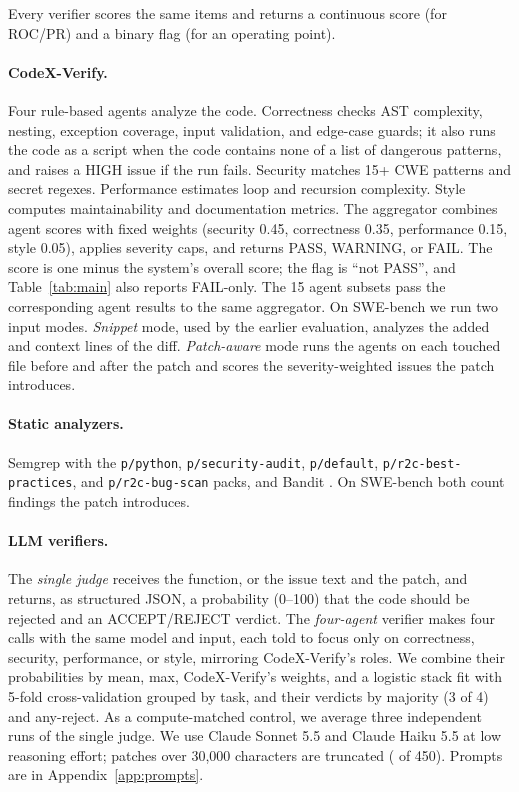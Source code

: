 Every verifier scores the same items and returns a continuous score (for ROC/PR) and a binary flag (for an operating point).

\paragraph{CodeX-Verify.}
Four rule-based agents analyze the code. Correctness checks AST complexity, nesting, exception coverage, input validation, and edge-case guards; it also runs the code as a script when the code contains none of a list of dangerous patterns, and raises a HIGH issue if the run fails. Security matches 15+ CWE patterns and secret regexes. Performance estimates loop and recursion complexity. Style computes maintainability and documentation metrics. The aggregator combines agent scores with fixed weights (security 0.45, correctness 0.35, performance 0.15, style 0.05), applies severity caps, and returns PASS, WARNING, or FAIL. The score is one minus the system's overall score; the flag is ``not PASS'', and Table~\ref{tab:main} also reports FAIL-only. The 15 agent subsets pass the corresponding agent results to the same aggregator. On SWE-bench we run two input modes. \emph{Snippet} mode, used by the earlier evaluation, analyzes the added and context lines of the diff. \emph{Patch-aware} mode runs the agents on each touched file before and after the patch and scores the severity-weighted issues the patch introduces.

\paragraph{Static analyzers.}
Semgrep \citep{semgrep} with the \texttt{p/python}, \texttt{p/security-audit}, \texttt{p/default}, \texttt{p/r2c-best-practices}, and \texttt{p/r2c-bug-scan} packs, and Bandit \citep{bandit}. On SWE-bench both count findings the patch introduces.

\paragraph{LLM verifiers.}
The \emph{single judge} receives the function, or the issue text and the patch, and returns, as structured JSON, a probability (0--100) that the code should be rejected and an ACCEPT/REJECT verdict. The \emph{four-agent} verifier makes four calls with the same model and input, each told to focus only on correctness, security, performance, or style, mirroring CodeX-Verify's roles. We combine their probabilities by mean, max, CodeX-Verify's weights, and a logistic stack fit with 5-fold cross-validation grouped by task, and their verdicts by majority (3 of 4) and any-reject. As a compute-matched control, we average three independent runs of the single judge. We use Claude Sonnet 5.5 and Claude Haiku 5.5 at low reasoning effort; patches over 30,000 characters are truncated (\nNTruncated{} of 450). Prompts are in Appendix~\ref{app:prompts}.

